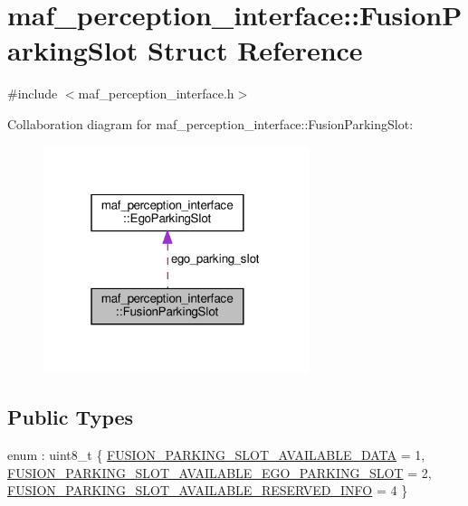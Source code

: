 \hypertarget{structmaf__perception__interface_1_1FusionParkingSlot}{}\section{maf\+\_\+perception\+\_\+interface\+:\+:Fusion\+Parking\+Slot Struct Reference}
\label{structmaf__perception__interface_1_1FusionParkingSlot}


{\ttfamily \#include $<$maf\+\_\+perception\+\_\+interface.\+h$>$}



Collaboration diagram for maf\+\_\+perception\+\_\+interface\+:\+:Fusion\+Parking\+Slot\+:\nopagebreak
\begin{figure}[H]
\begin{center}
\leavevmode
\includegraphics[width=220pt]{structmaf__perception__interface_1_1FusionParkingSlot__coll__graph}
\end{center}
\end{figure}
\subsection*{Public Types}
\begin{DoxyCompactItemize}
\item 
enum \+: uint8\+\_\+t \{ \hyperlink{structmaf__perception__interface_1_1FusionParkingSlot_a01968bcb5d4b40e847741bf6ea66a509a6f1ca6014d4a260470cbf6eaf003171f}{F\+U\+S\+I\+O\+N\+\_\+\+P\+A\+R\+K\+I\+N\+G\+\_\+\+S\+L\+O\+T\+\_\+\+A\+V\+A\+I\+L\+A\+B\+L\+E\+\_\+\+D\+A\+TA} = 1, 
\hyperlink{structmaf__perception__interface_1_1FusionParkingSlot_a01968bcb5d4b40e847741bf6ea66a509a18aaa692f65c224e0c6a389fb286f6e9}{F\+U\+S\+I\+O\+N\+\_\+\+P\+A\+R\+K\+I\+N\+G\+\_\+\+S\+L\+O\+T\+\_\+\+A\+V\+A\+I\+L\+A\+B\+L\+E\+\_\+\+E\+G\+O\+\_\+\+P\+A\+R\+K\+I\+N\+G\+\_\+\+S\+L\+OT} = 2, 
\hyperlink{structmaf__perception__interface_1_1FusionParkingSlot_a01968bcb5d4b40e847741bf6ea66a509a747a9ebdf823b452c9bf2aae6debca73}{F\+U\+S\+I\+O\+N\+\_\+\+P\+A\+R\+K\+I\+N\+G\+\_\+\+S\+L\+O\+T\+\_\+\+A\+V\+A\+I\+L\+A\+B\+L\+E\+\_\+\+R\+E\+S\+E\+R\+V\+E\+D\+\_\+\+I\+N\+FO} = 4
 \}
\end{DoxyCompactItemize}
